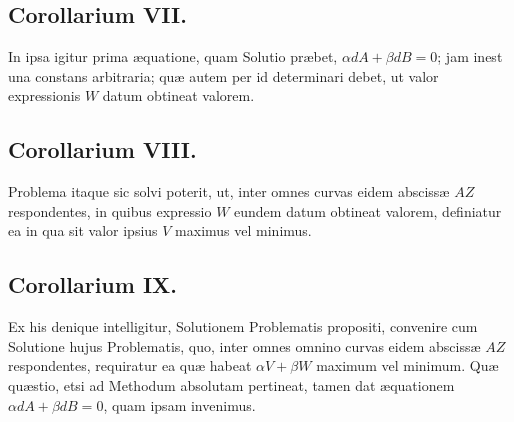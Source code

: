 \subsection*{Corollarium VII.}
In ipsa igitur prima æquatione, quam Solutio præbet, $\alpha dA+\beta dB=0$; jam inest una constans arbitraria; quæ autem per id determinari debet, ut valor expressionis $W$ datum obtineat valorem.

\subsection*{Corollarium VIII.}
Problema itaque sic solvi poterit, ut, inter omnes curvas eidem abscissæ $AZ$ respondentes, in quibus expressio $W$ eundem datum obtineat valorem, definiatur ea in qua sit valor ipsius $V$ maximus vel minimus.

\subsection*{Corollarium IX.}
Ex his denique intelligitur, Solutionem Problematis propositi, convenire cum Solutione hujus Problematis, quo, inter omnes omnino curvas eidem abscissæ $AZ$ respondentes, requiratur ea quæ habeat $\alpha V+\beta W$ maximum vel minimum. Quæ quæstio, etsi ad Methodum absolutam pertineat, tamen dat æquationem $\alpha dA+\beta dB=0$, quam ipsam invenimus.

